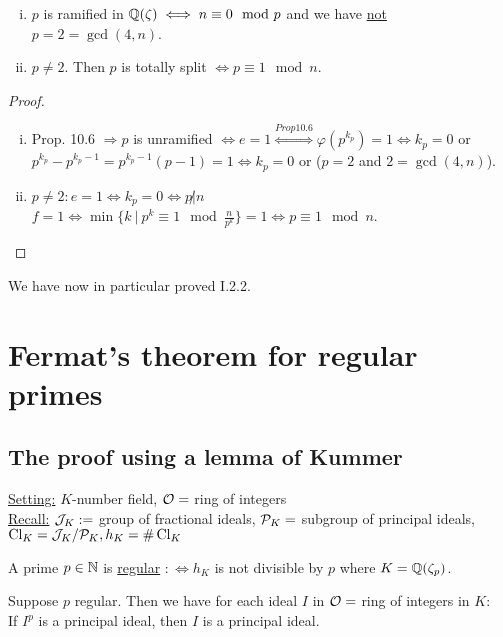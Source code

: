 \begin{Kor}
\begin{enumerate}[i)]
\item $p$ is ramified in $\mathbb{Q}(\zeta) \iff n \equiv 0 \mod p$ and we have \underline{not} $p=2=\gcd(4,n)$.
\item $p \neq 2$. Then $p$ is totally split $\iff p \equiv 1 \mod n$.
\end{enumerate}
\end{Kor}

\begin{proof}
\begin{enumerate}[i)]
\item Prop. 10.6 $\Rightarrow p$ is unramified $\iff e=1 \stackrel{Prop 10.6}{\iff} \varphi(p^{k_p})=1 \iff k_p=0$ or $p^{k_p}-p^{k_p -1} = p^{k_p -1} (p-1) = 1 \iff k_p=0$ or ($p=2$ and $2=\gcd(4,n)$).
\item $p \neq 2: e=1 \iff k_p=0 \iff p \not | n$\\
\hphantom{$p \neq 2:$} $f=1 \iff  \min\{k \ | \ p^k \equiv 1 \mod \frac{n}{p^k}\} =1 \iff p \equiv 1 \mod n$.
\end{enumerate}
\end{proof}

\begin{Bem}
We have now in particular proved I.2.2.
\end{Bem}

\chapter{Fermat's theorem for regular primes}
\section{The proof using a lemma of Kummer}
\underline{Setting:} $K$-number field, $\mathcal{O}=$ ring of integers\\
\underline{Recall:} $\mathcal{J}_K:= $ group of fractional ideals, $\mathcal{P}_K=$ subgroup of principal ideals,\linebreak
$\operatorname{Cl}_K=\mathcal{J}_K/\mathcal{P}_K, h_K=\#\operatorname{Cl}_K$

\begin{defi}
A prime $p \in \mathbb{N}$ is \underline{regular} $:\iff h_K$ is not divisible by $p$ where $K=\mathbb{Q}(\zeta_p)$.
\end{defi}

\begin{Bem}
Suppose $p$ regular. Then we have for each ideal $I$ in $\mathcal{O}=$ ring of integers in $K$:\\
If $I^p$ is a principal ideal, then $I$ is a principal ideal.
\end{Bem}

